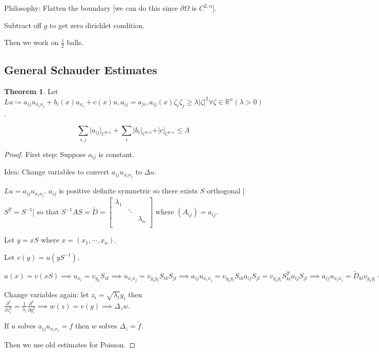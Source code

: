 \documentclass{article}
\theoremstyle{definition}
\newtheorem{theorem}{Theorem}
\begin{document}
Philosophy: Flatten the boundary [we can do this since \(\partial \Omega\) is \(C^{2,\alpha}\)].

Subtract off \(g\) to get zero dirichlet condition.

Then we work on \(\frac{1}{2}\) balls.

\subsection*{General Schauder Estimates}

\begin{theorem}
    
    Let \(Lu \coloneqq a_{ij} u_{x_i x_j} + b_i(x) u_{x_i} + c(x) u, a_{ij} = a_{ji}, a_{ij}(x) \zeta_i \zeta_j \geq \lambda \vert \zeta \vert ^2 \forall \zeta \in \mathbb{R}^n (\lambda > 0)\).

    \[
        \sum_{i,j} \vert a_{ij} \vert _{C^{0,\alpha}} + \sum_{i} \vert b_i \vert _{C^{0,\alpha}} + \vert c \vert _{C^{0,\alpha}} \leq \Lambda  
    \]
\end{theorem}

\begin{proof}
    First step: Suppose \(a_{ij}\) is constant.

    Idea: Change variables to convert \(a_{ij} u_{x_i x_j}\) to \(\Delta u\).

    \(L u = a_{ij} u_{x_i x_j}\). \(a_{ij}\) is positive definite symmetric so there exists \(S\) orthogonal [\(S^T = S ^{-1}\)] so that \(S ^{-1} A S = \widetilde{D} = \begin{bmatrix}
        \lambda_1 &  &   \\
         & \ddots &   \\
         &  &  \lambda_n \\
    \end{bmatrix}\) where \((A_{ij})=a_{ij}\).
    
    Let \(y = xS\) where \(x = (x_1, \cdots , x_n)\).

    Let \(v(y) = u(y S ^{-1})\).

    \(u(x) = v(xS) \implies u_{x_i} = v_{y_k} S_{ik}\implies u_{x_i x_j} = v_{y_k y_l} S_{ik} S_{jl} \implies a_{ij} u_{x_i x_j} = v_{y_k y_l} S_{ik} a_{ij} S_{jl} = v_{y_k y_l} S_{ki}^T a_{ij} S_{jl} \implies a_{ij} u_{x_i x_j} = \widetilde{D}_{kl} v_{y_k y_l} = \widetilde{D} D^2 v = \lambda_1 v_{y_1 y_1} + \cdots \lambda_n v_{y_n y_n}\)
    
    Change variables again: let \(z_i = \sqrt{\lambda_i} y_i\) then \(\frac{\partial^2}{\partial z_i^2} = \frac{1}{\lambda_i} \frac{\partial^2}{\partial y_i^2} \implies w(z) = v(y) \implies \Delta_z w\).

    If \(u\) solves \(a_{ij} u_{x_i x_j} = f\) then \(w\) solves \(\Delta_z = \widetilde{f}\).
    
    Then we use old estimates for Poisson.
 
\end{proof}
\end{document}
